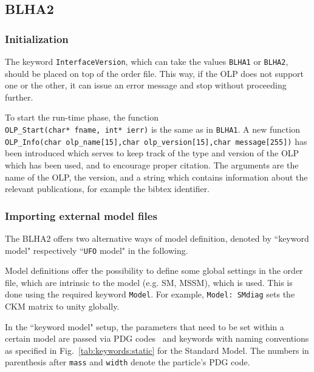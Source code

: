 \subsection{BLHA2}



\subsubsection{Initialization}
The keyword {\tt InterfaceVersion}, which can take the values
{\tt BLHA1} or {\tt BLHA2}, should be placed on top of the order file. 
This way, if the OLP does not support one or the other, it can issue an error message and stop 
without proceeding further.

To start the run-time phase, the function\\
 {\tt OLP\_Start(char* fname, int* ierr)} is the same  as in {\tt BLHA1}.
A new function\\
{\tt \small OLP\_Info(char olp\_name[15],char olp\_version[15],char message[255])} 
has been introduced
which serves to keep track of the type and version of the OLP which has been used,
and to encourage proper citation. 
The arguments are the name of the OLP, the version, and a string which  
contains information about
the relevant publications, for example the bibtex identifier.

\subsubsection{Importing external model files}

The BLHA2 offers two alternative ways of model definition, denoted by 
``keyword model" respectively ``{\tt UFO} model" in the following.

Model definitions offer the possibility to define some global settings 
in the order file, which are intrinsic to the model (e.g. SM, MSSM), which 
is used.
This is done using the required keyword {\tt Model}.
For example, {\tt Model: SMdiag} sets the CKM matrix to unity globally.

In the ``keyword model" setup, 
the parameters that need to be set within a certain model 
are passed via PDG codes~\cite{Beringer:1900zz} and keywords 
with naming
conventions as specified in Fig.~\ref{tab:keywords:static} for the Standard
Model. The numbers in parenthesis after {\tt mass} and {\tt width}  denote
the particle's PDG code.

